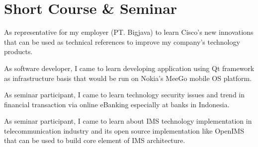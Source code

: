 \documentclass[10pt, a4paper]{moderncv}
\begin{document}
\section{Short Course \& Seminar}
{
    \begin{scriptsize}
    As representative for my employer (PT. Bigjava) to learn Cisco's new
    innovations that can be used as technical references to improve my company's
    technology products.\\
    \end{scriptsize}
}
{
    \begin{scriptsize}
    As software developer, I came to learn developing application using Qt framework
    as infrastructure basis that would be run on Nokia's MeeGo mobile OS platform.\\
    \end{scriptsize}
}
{
    \begin{scriptsize}
    As seminar participant, I came to learn technology security issues and trend in financial
    transaction via online eBanking especially at banks in Indonesia.\\
    \end{scriptsize}
}
{
    \begin{scriptsize}
    As seminar participant, I came to learn about IMS technology implementation
    in telecommunication industry and its open source implementation like OpenIMS that
    can be used to build core element of IMS architecture.\\
    \end{scriptsize}
}
\end{document}
